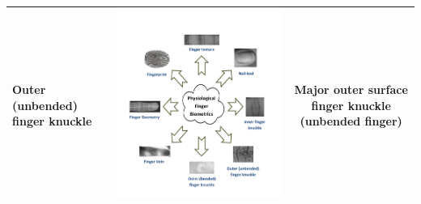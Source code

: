 \documentclass[review]{elsarticle}
\begin{document}
\begin{table}[h]
{\begin{tabular}{|C{3.7cm}|C{3.7cm}|c|}
			\textbf{Outer (unbended) finger knuckle}& \begin{minipage}{.75\hsize}\includegraphics[page=1,scale=.5,trim=18.4cm 5.4cm 2cm 21.6cm,clip]{Finger_biometrics.pdf}\end{minipage} & Major outer surface finger knuckle (unbended finger)\\ \hline

\end{tabular}}
\end{table}
\end{document}
